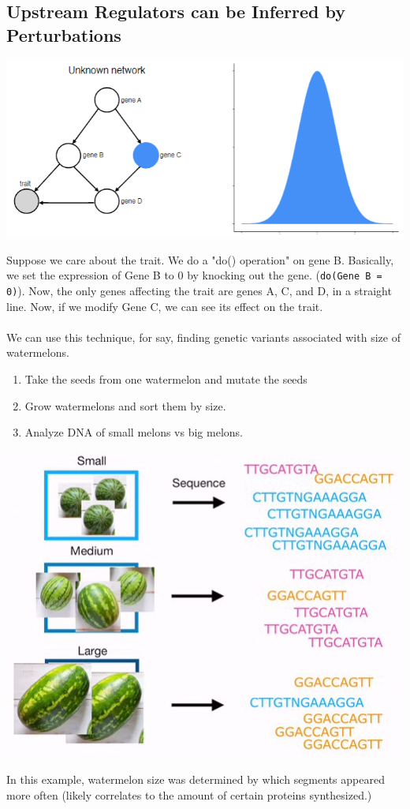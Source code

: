 \documentclass[10pt]{article}
\begin{document}
\subsection*{Upstream Regulators can be Inferred by Perturbations}
\begin{center}
    \includegraphics*[scale=0.8]{W9_2.png}
\end{center}
Suppose we care about the trait.  We do a "do() operation" on gene B.  Basically, we set the expression of Gene B to 0 by knocking out the gene. (\texttt{do(Gene B = 0)}).  Now, the only genes affecting the trait are genes A, C, and D, in a straight line.  Now, if we modify Gene C, we can see its effect on the trait.\\\\
We can use this technique, for say, finding genetic variants associated with size of watermelons.
\begin{enumerate}
    \item Take the seeds from one watermelon and mutate the seeds
    \item Grow watermelons and sort them by size.
    \item Analyze DNA of small melons vs big melons.
\end{enumerate}
\begin{center}
    \includegraphics*[scale=0.8]{W9_3.png}
\end{center}
In this example, watermelon size was determined by which segments appeared more often (likely correlates to the amount of certain proteins synthesized.)
\end{document}
